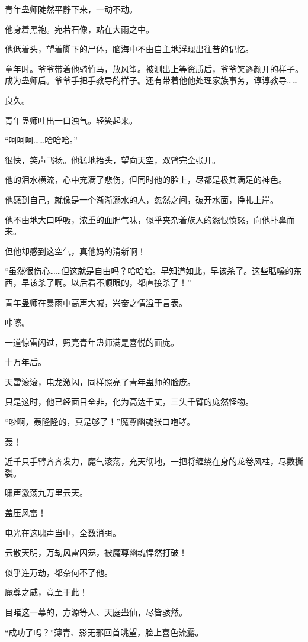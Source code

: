 \begin{this_body}
青年蛊师陡然平静下来，一动不动。

他身着黑袍。宛若石像，站在大雨之中。

他低着头，望着脚下的尸体，脑海中不由自主地浮现出往昔的记忆。

童年时。爷爷带着他骑竹马，放风筝。被测出上等资质后，爷爷笑逐颜开的样子。成为蛊师后。爷爷手把手教导的样子。还有带着他他处理家族事务，谆谆教导……

良久。

青年蛊师吐出一口浊气。轻笑起来。

“呵呵呵……哈哈哈。”

很快，笑声飞扬。他猛地抬头，望向天空，双臂完全张开。

他的泪水横流，心中充满了悲伤，但同时他的脸上，尽都是极其满足的神色。

他感到自己，就像是一个渐渐溺水的人，忽然之间，破开水面，挣扎上岸。

他不由地大口呼吸，浓重的血腥气味，似乎夹杂着族人的怨恨愤怒，向他扑鼻而来。

但他却感到这空气，真他妈的清新啊！

“虽然很伤心……但这就是自由吗？哈哈哈。早知道如此，早该杀了。这些聒噪的东西，早该杀了啊。以后看不顺眼的，都直接杀了！”

青年蛊师在暴雨中高声大喊，兴奋之情溢于言表。

咔嚓。

一道惊雷闪过，照亮青年蛊师满是喜悦的面庞。

十万年后。

天雷滚滚，电龙激闪，同样照亮了青年蛊师的脸庞。

只是这时，他已经面目全非，化为高达千丈，三头千臂的庞然怪物。

“吵啊，轰隆隆的，真是够了！”魔尊幽魂张口咆哮。

轰！

近千只手臂齐齐发力，魔气滚荡，充天彻地，一把将缠绕在身的龙卷风柱，尽数撕裂。

啸声激荡九万里云天。

盖压风雷！

电光在这啸声当中，全数消弭。

云散天明，万劫风雷囚笼，被魔尊幽魂悍然打破！

似乎连万劫，都奈何不了他。

魔尊之威，竟至于此！

目睹这一幕的，方源等人、天庭蛊仙，尽皆骇然。

“成功了吗？”薄青、影无邪回首眺望，脸上喜色流露。


\end{this_body}
